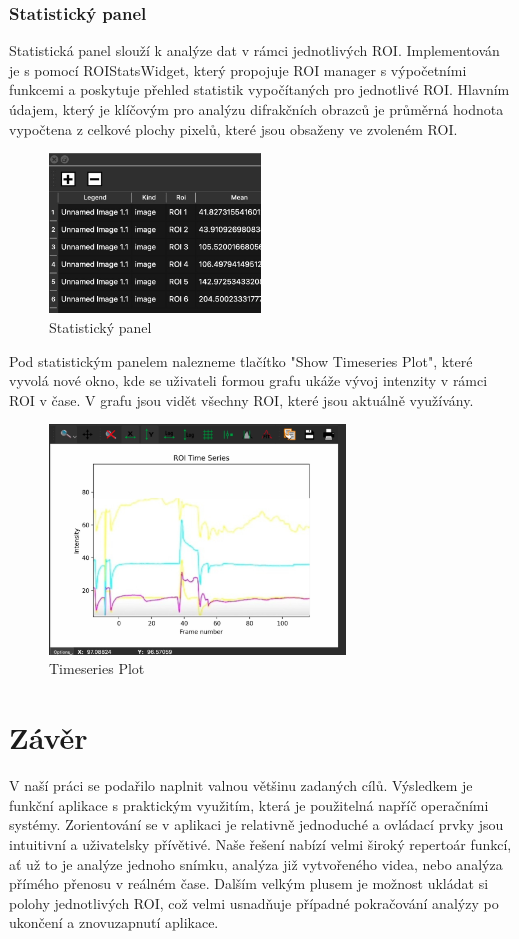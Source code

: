 \documentclass[a4paper,11pt]{article}
\begin{document}
\subsubsection{Statistický panel}
Statistická panel slouží k analýze dat v rámci jednotlivých ROI. Implementován je s pomocí ROIStatsWidget, který propojuje ROI manager s výpočetními funkcemi a poskytuje přehled statistik vypočítaných pro jednotlivé ROI. Hlavním údajem, který je klíčovým pro analýzu difrakčních obrazců je průměrná hodnota vypočtena z celkové plochy pixelů, které jsou obsaženy ve zvoleném ROI.
\begin{figure}[H]
    \centering
    \includegraphics[width=0.5\textwidth]{images/StatistickyPanel.jpg}
    \caption{Statistický panel}
\end{figure}
Pod statistickým panelem nalezneme tlačítko "Show Timeseries Plot", které vyvolá nové okno, kde se uživateli formou grafu ukáže vývoj intenzity v rámci ROI v čase. V grafu jsou vidět všechny ROI, které jsou aktuálně využívány.

\begin{figure}[H]
    \centering
    \includegraphics[width=0.7\textwidth]{images/TimeseriesPlot.png}
    \caption{Timeseries Plot}
\end{figure}

\newpage

\section{Závěr}
V naší práci se podařilo naplnit valnou většinu zadaných cílů. Výsledkem je funkční aplikace s praktickým využitím, která je použitelná napříč operačními systémy. Zorientování se v aplikaci je relativně jednoduché a ovládací prvky jsou intuitivní a uživatelsky přívětivé. Naše řešení nabízí velmi široký repertoár funkcí, ať už to je analýze jednoho snímku, analýza již vytvořeného videa, nebo analýza přímého přenosu v reálném čase. Dalším velkým plusem je možnost ukládat si polohy jednotlivých ROI, což velmi usnadňuje případné pokračování analýzy po ukončení a znovuzapnutí aplikace.
\end{document}
